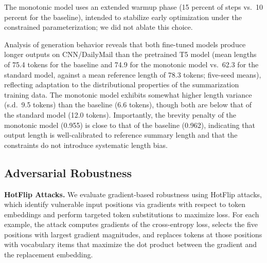 \documentclass{article}
\theoremstyle{plain}
\theoremstyle{definition}
\theoremstyle{remark}
\begin{document}
\begin{table}[t]
\caption{Summarization quality on the full XSUM test set ($n = 11{,}333$). Values are ROUGE F$_1$ $\times 100$, mean $\pm$ s.d.\ over five training seeds.}
\label{tab:xsum}
\vskip 0.1in
\centering
{}
\vskip -0.1in
\end{table}

The monotonic model uses an extended warmup phase (15 percent of steps vs.\ 10 percent for the baseline), intended to stabilize early optimization under the constrained parameterization; we did not ablate this choice.

Analysis of generation behavior reveals that both fine-tuned models produce longer outputs on CNN/DailyMail than the pretrained T5 model (mean lengths of 75.4 tokens for the baseline and 74.9 for the monotonic model vs.\ 62.3 for the standard model, against a mean reference length of 78.3 tokens; five-seed means), reflecting adaptation to the distributional properties of the summarization training data. The monotonic model exhibits somewhat higher length variance (s.d.\ 9.5 tokens) than the baseline (6.6 tokens), though both are below that of the standard model (12.0 tokens). Importantly, the brevity penalty of the monotonic model (0.955) is close to that of the baseline (0.962), indicating that output length is well-calibrated to reference summary length and that the constraints do not introduce systematic length bias.

\subsection{Adversarial Robustness}

\textbf{HotFlip Attacks.}
We evaluate gradient-based robustness using HotFlip attacks, which identify vulnerable input positions via gradients with respect to token embeddings and perform targeted token substitutions to maximize loss. For each example, the attack computes gradients of the cross-entropy loss, selects the five positions with largest gradient magnitudes, and replaces tokens at those positions with vocabulary items that maximize the dot product between the gradient and the replacement embedding.
\end{document}
